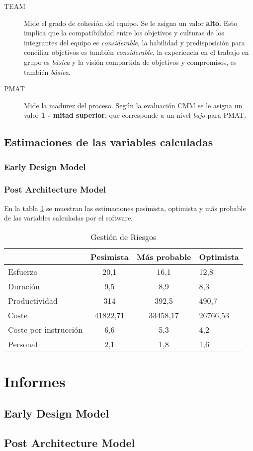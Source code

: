 \documentclass[11pt,a4paper,spanish,twoside]{book}
\begin{document}
\begin{description}
\item[TEAM] Mide el grado de cohesión del equipo. Se le asigna un valor
\textbf{alto}. Esto implica que la compatibilidad entre los objetivos y
culturas de los integrantes del equipo es \emph{considerable}, la habilidad
y predisposición para conciliar objetivos es también \emph{considerable}, la
experiencia en el trabajo en grupo es \emph{básica} y la visión compartida
de objetivos y compromisos, es también \emph{básica}.

\item[PMAT] Mide la madurez del proceso. Según la evaluación CMM se le asigna
un valor \textbf{1 - mitad superior}, que corresponde a un nivel \emph{bajo}
para PMAT.
\end{description}

\section{Estimaciones de las variables calculadas}
\subsection{Early Design Model}

\subsection{Post Architecture Model}
En la tabla \ref{Tab:EstPOMP} se muestran las estimaciones pesimista,
optimista y más probable de las variables calculadas por el software.
\begin{table}[!h]
  \centering
  \begin{tabular}{p{4.5cm}|c|c|b{2cm}<{\centering}}
    & \textbf{Pesimista} & \textbf{Más probable} & \textbf{Optimista}\\
    \hline \hline
    Esfuerzo & 20,1 & 16,1 & 12,8 \\ \hline
    Duración & 9,5 & 8,9 & 8,3 \\ \hline
    Productividad & 314 & 392,5 & 490,7 \\ \hline
    Coste & 41822,71 & 33458,17 & 26766,53 \\ \hline
    Coste por instrucción & 6,6 & 5,3 & 4,2 \\ \hline
    Personal & 2,1 & 1,8 & 1,6 \\ \hline
  \end{tabular}
  \caption{Gestión de Riesgos} \label{Tab:EstPOMP}
\end{table}

\chapter{Informes}
\section{Early Design Model}
\section{Post Architecture Model}
\end{document}
